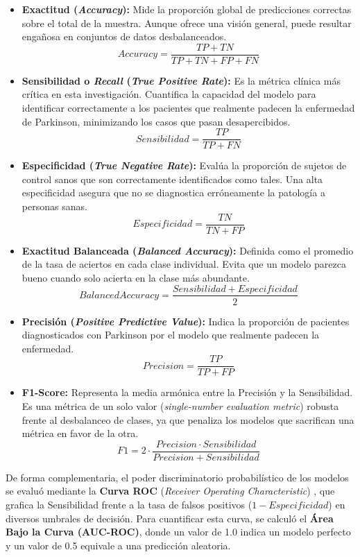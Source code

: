 \begin{itemize}
    \item \textbf{Exactitud (\textit{Accuracy}):} Mide la proporción global de predicciones correctas sobre el total de la muestra. Aunque ofrece una visión general, puede resultar engañosa en conjuntos de datos desbalanceados.
    $$Accuracy = \frac{TP + TN}{TP + TN + FP + FN}$$
    
    \item \textbf{Sensibilidad o \textit{Recall} (\textit{True Positive Rate}):} Es la métrica clínica más crítica en esta investigación. Cuantifica la capacidad del modelo para identificar correctamente a los pacientes que realmente padecen la enfermedad de Parkinson, minimizando los casos que pasan desapercibidos.
    $$Sensibilidad = \frac{TP}{TP + FN}$$
    
    \item \textbf{Especificidad (\textit{True Negative Rate}):} Evalúa la proporción de sujetos de control sanos que son correctamente identificados como tales. Una alta especificidad asegura que no se diagnostica erróneamente la patología a personas sanas.
    $$Especificidad = \frac{TN}{TN + FP}$$

    \item \textbf{Exactitud Balanceada (\textit{Balanced Accuracy}):} Definida como el promedio de la tasa de aciertos en cada clase individual. Evita que un modelo parezca bueno cuando solo acierta en la clase más abundante.
    $$Balanced Accuracy = \frac{Sensibilidad + Especificidad}{2}$$
    
    \item \textbf{Precisión (\textit{Positive Predictive Value}):} Indica la proporción de pacientes diagnosticados con Parkinson por el modelo que realmente padecen la enfermedad.
    $$Precision = \frac{TP}{TP + FP}$$
    
    \item \textbf{F1-Score:} Representa la media armónica entre la Precisión y la Sensibilidad. Es una métrica de un solo valor (\textit{single-number evaluation metric}) robusta frente al desbalanceo de clases, ya que penaliza los modelos que sacrifican una métrica en favor de la otra.
    $$F1 = 2 \cdot \frac{Precision \cdot Sensibilidad}{Precision + Sensibilidad}$$
\end{itemize}

De forma complementaria, el poder discriminatorio probabilístico de los modelos se evaluó mediante la \textbf{Curva ROC} (\textit{Receiver Operating Characteristic}) \cite{fawcett2006}, que grafica la Sensibilidad frente a la tasa de falsos positivos ($1 - Especificidad$) en diversos umbrales de decisión. Para cuantificar esta curva, se calculó el \textbf{Área Bajo la Curva (AUC-ROC)}, donde un valor de 1.0 indica un modelo perfecto y un valor de 0.5 equivale a una predicción aleatoria.